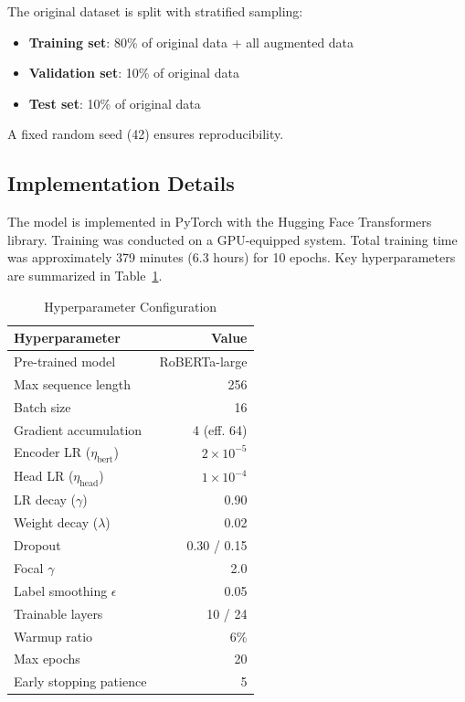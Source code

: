 \documentclass[conference, 10pt]{IEEEtran}
\begin{document}
The original dataset is split with stratified sampling:
\begin{itemize}[noitemsep]
    \item \textbf{Training set}: 80\% of original data + all augmented data
    \item \textbf{Validation set}: 10\% of original data
    \item \textbf{Test set}: 10\% of original data
\end{itemize}

A fixed random seed (42) ensures reproducibility.

\subsection{Implementation Details}

The model is implemented in PyTorch with the Hugging Face Transformers library. Training was conducted on a GPU-equipped system. Total training time was approximately 379 minutes (6.3 hours) for 10 epochs. Key hyperparameters are summarized in Table~\ref{tab:hyperparams}.

\begin{table}[t]
    \centering
    \caption{Hyperparameter Configuration}
    \label{tab:hyperparams}
    \begin{tabular}{lr}
        \toprule
        \textbf{Hyperparameter} & \textbf{Value} \\
        \midrule
        Pre-trained model       & RoBERTa-large \\
        Max sequence length     & 256 \\
        Batch size              & 16 \\
        Gradient accumulation   & 4 (eff. 64) \\
        Encoder LR ($\eta_{\text{bert}}$) & $2 \times 10^{-5}$ \\
        Head LR ($\eta_{\text{head}}$)    & $1 \times 10^{-4}$ \\
        LR decay ($\gamma$)     & 0.90 \\
        Weight decay ($\lambda$)& 0.02 \\
        Dropout                 & 0.30 / 0.15 \\
        Focal $\gamma$          & 2.0 \\
        Label smoothing $\epsilon$ & 0.05 \\
        Trainable layers        & 10 / 24 \\
        Warmup ratio            & 6\% \\
        Max epochs              & 20 \\
        Early stopping patience & 5 \\
        \bottomrule
    \end{tabular}
\end{table}
\end{document}

